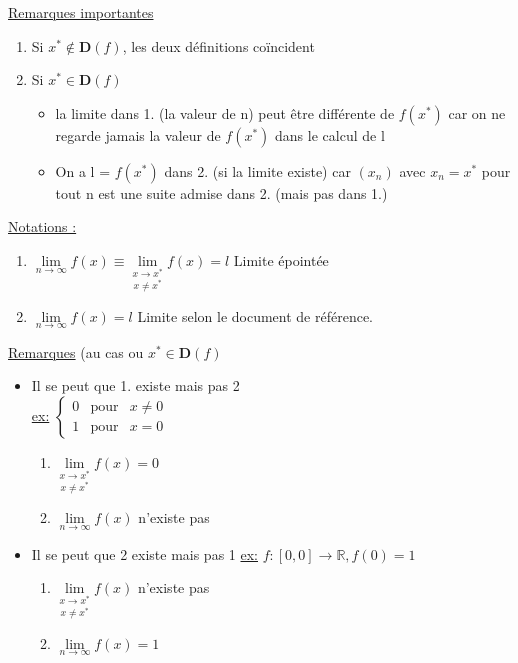 \documentclass[12pt,a4paper]{article}
\newcommand{\limite}{\lim\limits_}
\newcommand{\ninf}{\ensuremath{n \to \infty}}
\newcommand{\R}{\ensuremath{\mathbb{R}} }
\begin{document}
{\begin{boite}
\underline{Remarques importantes}
	\begin{enumerate}
		\item Si $x^* \not \in \mathbf{D}(f)$, les deux définitions coïncident
		\item Si $x^* \in \mathbf{D}(f)$
			\begin{itemize}
				\item la limite dans 1. (la valeur de n) peut être différente de $f(x^*)$ car on ne regarde jamais la valeur de $f(x^*)$ dans le calcul de l
				\item On a l = $f(x^*)$ dans 2. (si la limite existe) car $(x_n)$ avec $x_n = x^*$ pour tout n est une suite admise dans 2. (mais pas dans 1.)
			\end{itemize}
	\end{enumerate}
\end{boite}

\underline{Notations :}
\begin{boite}
	\begin{enumerate}
		\item $\limite{\ninf} f(x) \equiv \underset{x \neq x^*}{\lim\limits_{x \to x^*}} f(x) = l$ Limite épointée
		\item $\limite{\ninf} f(x) = l$ Limite selon le document de référence.
	\end{enumerate}
\end{boite}

\underline{Remarques} (au cas ou $x^* \in \mathbf{D}(f)$\\
\begin{itemize}
\item Il se peut que 1. existe mais pas 2 \\
\underline{ex:}
$\left\{
\begin{array}{lll}
0 & \mbox{pour} & x \neq 0\\
1 & \mbox{pour} & x = 0
\end{array}
\right.$
\begin{enumerate}
\item $\underset{x \neq x^*}{\lim\limits_{x \to x^*}} f(x) = 0$
\item $\limite{\ninf} f(x)$ n'existe pas
\end{enumerate}
\item Il se peut que 2 existe mais pas 1
\underline{ex:} $f:[0,0] \to \R, f(0) = 1$
\begin{enumerate}
\item $\underset{x \neq x^*}{\lim\limits_{x \to x^*}} f(x)$ n'existe pas
\item $\limite{\ninf} f(x) = 1$
\end{enumerate}
\end{itemize}

}
\end{document}
